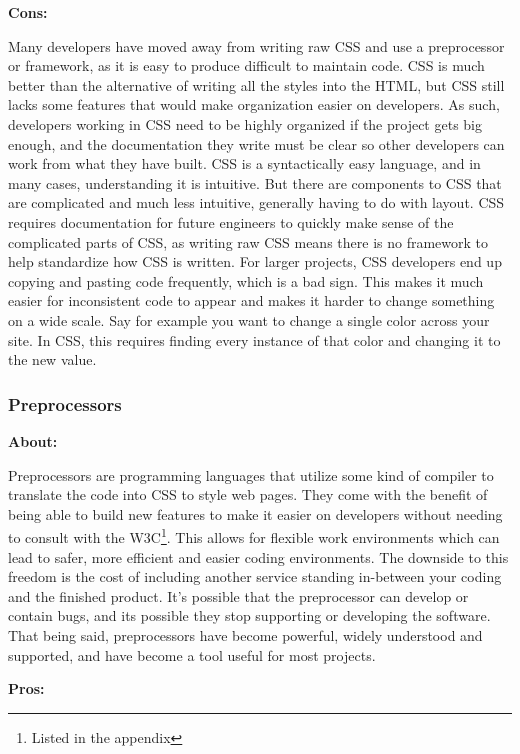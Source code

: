 \documentclass[draftclsnofoot,onecolumn,letterpaper,10pt,compsoc]{IEEEtran}
\begin{document}
    \noindent \textbf{Cons:}

    Many developers have moved away from writing raw CSS and use a preprocessor or framework, as it is easy to produce difficult to maintain code.
    CSS is much better than the alternative of writing all the styles into the HTML, but CSS still lacks some features that would make organization easier on developers.
    As such, developers working in CSS need to be highly organized if the project gets big enough, and the documentation they write must be clear so other developers can work from what they have built.
    CSS is a syntactically easy language, and in many cases, understanding it is intuitive.
    But there are components to CSS that are complicated and much less intuitive, generally having to do with layout.\cite{CSSProCon}
    CSS requires documentation for future engineers to quickly make sense of the complicated parts of CSS, as writing raw CSS means there is no framework to help standardize how CSS is written.
    For larger projects, CSS developers end up copying and pasting code frequently, which is a bad sign.
    This makes it much easier for inconsistent code to appear and makes it harder to change something on a wide scale.
    Say for example you want to change a single color across your site.
    In CSS, this requires finding every instance of that color and changing it to the new value.

    \subsubsection{Preprocessors}
    \textbf{About:}

    Preprocessors are programming languages that utilize some kind of compiler to translate the code into CSS to style web pages.
    They come with the benefit of being able to build new features to make it easier on developers without needing to consult with the W3C\footnote{Listed in the appendix}.
    This allows for flexible work environments which can lead to safer, more efficient and easier coding environments.
    The downside to this freedom is the cost of including another service standing in-between your coding and the finished product.
    It's possible that the preprocessor can develop or contain bugs, and its possible they stop supporting or developing the software.
    That being said, preprocessors have become powerful, widely understood and supported, and have become a tool useful for most projects.

    \noindent \textbf{Pros:}
\end{document}
